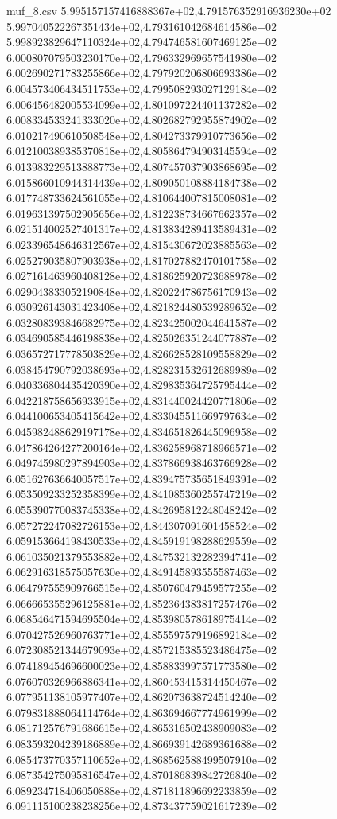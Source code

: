 \begin{filecontents*}{muf_8.csv}
5.995157157416888367e+02,4.791576352916936230e+02
5.997040522267351434e+02,4.793161042684614586e+02
5.998923829647110324e+02,4.794746581607469125e+02
6.000807079503230170e+02,4.796332969657541980e+02
6.002690271783255866e+02,4.797920206806693386e+02
6.004573406434511753e+02,4.799508293027129184e+02
6.006456482005534099e+02,4.801097224401137282e+02
6.008334533241333020e+02,4.802682792955874902e+02
6.010217490610508548e+02,4.804273379910773656e+02
6.012100389385370818e+02,4.805864794903145594e+02
6.013983229513888773e+02,4.807457037903868695e+02
6.015866010944314439e+02,4.809050108884184738e+02
6.017748733624561055e+02,4.810644007815008081e+02
6.019631397502905656e+02,4.812238734667662357e+02
6.021514002527401317e+02,4.813834289413589431e+02
6.023396548646312567e+02,4.815430672023885563e+02
6.025279035807903938e+02,4.817027882470101758e+02
6.027161463960408128e+02,4.818625920723688978e+02
6.029043833052190848e+02,4.820224786756170943e+02
6.030926143031423408e+02,4.821824480539289652e+02
6.032808393846682975e+02,4.823425002044641587e+02
6.034690585446198838e+02,4.825026351244077887e+02
6.036572717778503829e+02,4.826628528109558829e+02
6.038454790792038693e+02,4.828231532612689989e+02
6.040336804435420390e+02,4.829835364725795444e+02
6.042218758656933915e+02,4.831440024420771806e+02
6.044100653405415642e+02,4.833045511669797634e+02
6.045982488629197178e+02,4.834651826445096958e+02
6.047864264277200164e+02,4.836258968718966571e+02
6.049745980297894903e+02,4.837866938463766928e+02
6.051627636640057517e+02,4.839475735651849391e+02
6.053509233252358399e+02,4.841085360255747219e+02
6.055390770083745338e+02,4.842695812248048242e+02
6.057272247082726153e+02,4.844307091601458524e+02
6.059153664198430533e+02,4.845919198288629559e+02
6.061035021379553882e+02,4.847532132282394741e+02
6.062916318575057630e+02,4.849145893555587463e+02
6.064797555909766515e+02,4.850760479459577255e+02
6.066665355296125881e+02,4.852364383817257476e+02
6.068546471594695504e+02,4.853980578618975414e+02
6.070427526960763771e+02,4.855597579196892184e+02
6.072308521344679093e+02,4.857215385523486475e+02
6.074189454696600023e+02,4.858833997571773580e+02
6.076070326966886341e+02,4.860453415314450467e+02
6.077951138105977407e+02,4.862073638724514240e+02
6.079831888064114764e+02,4.863694667774961999e+02
6.081712576791686615e+02,4.865316502438909083e+02
6.083593204239186889e+02,4.866939142689361688e+02
6.085473770357110652e+02,4.868562588499507910e+02
6.087354275095816547e+02,4.870186839842726840e+02
6.089234718406050888e+02,4.871811896692233859e+02
6.091115100238238256e+02,4.873437759021617239e+02

\end{filecontents*}
